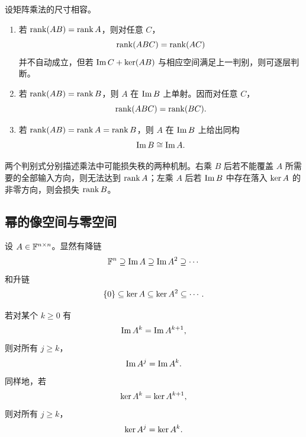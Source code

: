 \begin{corollary}
设矩阵乘法的尺寸相容。
\begin{enumerate}
  \item 若 $\operatorname{rank}(AB)=\operatorname{rank} A$，则对任意 $C$，
  \begin{equation}
   \operatorname{rank}(ABC)=\operatorname{rank}(AC)
  \end{equation}
  并不自动成立，但若 $\operatorname{Im} C+\operatorname{ker}(AB)$ 与相应空间满足上一判别，则可逐层判断。
  \item 若 $\operatorname{rank}(AB)=\operatorname{rank} B$，则 $A$ 在 $\operatorname{Im} B$ 上单射。因而对任意 $C$，
  \begin{equation}
   \operatorname{rank}(ABC)=\operatorname{rank}(BC).
  \end{equation}
  \item 若 $\operatorname{rank}(AB)=\operatorname{rank} A=\operatorname{rank} B$，则 $A$ 在 $\operatorname{Im} B$ 上给出同构
  \begin{equation}
   \operatorname{Im} B\cong\operatorname{Im} A.
  \end{equation}
\end{enumerate}
\end{corollary}

\begin{remark}
两个判别式分别描述乘法中可能损失秩的两种机制。右乘 $B$ 后若不能覆盖 $A$ 所需要的全部输入方向，则无法达到 $\operatorname{rank} A$；左乘 $A$ 后若 $\operatorname{Im} B$ 中存在落入 $\operatorname{ker} A$ 的非零方向，则会损失 $\operatorname{rank} B$。
\end{remark}

\subsection{幂的像空间与零空间}

设 $A\in\mathbb F^{n\times n}$。显然有降链
\begin{equation}
 \mathbb F^n\supseteq\operatorname{Im} A\supseteq\operatorname{Im} A^2\supseteq\cdots
\end{equation}
和升链
\begin{equation}
 \{0\}\subseteq\operatorname{ker} A\subseteq\operatorname{ker} A^2\subseteq\cdots.
\end{equation}

\begin{theorem}[稳定性]
若对某个 $k\geq0$ 有
\begin{equation}
 \operatorname{Im} A^k=\operatorname{Im} A^{k+1},
\end{equation}
则对所有 $j\geq k$，
\begin{equation}
 \operatorname{Im} A^j=\operatorname{Im} A^k.
\end{equation}
同样地，若
\begin{equation}
 \operatorname{ker} A^k=\operatorname{ker} A^{k+1},
\end{equation}
则对所有 $j\geq k$，
\begin{equation}
 \operatorname{ker} A^j=\operatorname{ker} A^k.
\end{equation}
\end{theorem}

